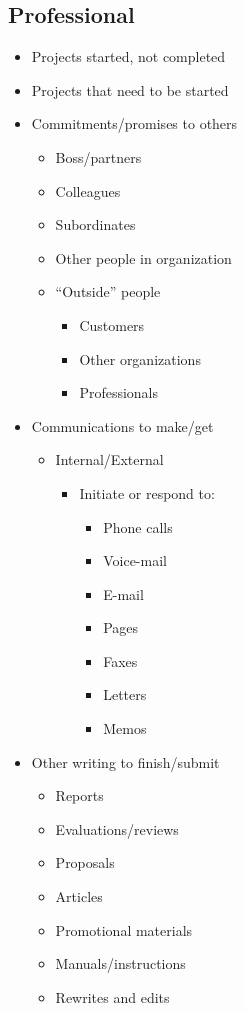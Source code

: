 \documentclass[10pt,landscape]{article}
\begin{document}
\begin{multicols}{3}
\subsection*{Professional}
\begin{itemize}
\item Projects started, not completed 
\item Projects that need to be started 
\item Commitments/promises to others \begin{itemize}
\item Boss/partners 
\item Colleagues 
\item Subordinates 
\item Other people in organization 
\item ``Outside'' people \begin{itemize}
\item Customers 
\item Other organizations 
\item Professionals 

\end{itemize}


\end{itemize}

\item Communications to make/get \begin{itemize}
\item Internal/External \begin{itemize}
\item Initiate or respond to: \begin{itemize}
\item Phone calls 
\item Voice-mail 
\item E-mail 
\item Pages 
\item Faxes 
\item Letters 
\item Memos 

\end{itemize}


\end{itemize}


\end{itemize}

\item Other writing to finish/submit \begin{itemize}
\item Reports 
\item Evaluations/reviews 
\item Proposals 
\item Articles 
\item Promotional materials 
\item Manuals/instructions 
\item Rewrites and edits 


\end{itemize}
\end{itemize}
\end{multicols}
\end{document}
